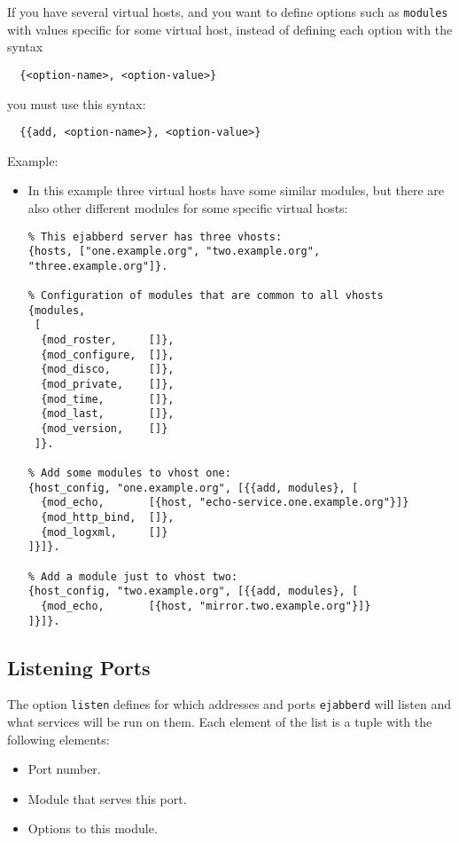 \documentclass[a4paper,10pt]{book}
\newcommand{\ind}[1]{\begin{latexonly}\index{#1}\end{latexonly}}
\newcommand{\option}[1]{\texttt{#1}}
\newcommand{\term}[1]{\texttt{#1}}
\newcommand{\ejabberd}{\texttt{ejabberd}}
\begin{document}
If you have several virtual hosts, 
and you want to define options such as \term{modules}
with values specific for some virtual host, 
instead of defining each option with the syntax
\begin{verbatim}
  {<option-name>, <option-value>}
\end{verbatim}
you must use this syntax:
\begin{verbatim}
  {{add, <option-name>}, <option-value>}
\end{verbatim}

Example:
\begin{itemize}
	\item In this example three virtual hosts have some similar modules, but there are also
	other different modules for some specific virtual hosts:
\begin{verbatim}
% This ejabberd server has three vhosts:
{hosts, ["one.example.org", "two.example.org", "three.example.org"]}.

% Configuration of modules that are common to all vhosts
{modules,
 [
  {mod_roster,     []},
  {mod_configure,  []},
  {mod_disco,      []},
  {mod_private,    []},
  {mod_time,       []},
  {mod_last,       []},
  {mod_version,    []}
 ]}.

% Add some modules to vhost one:
{host_config, "one.example.org", [{{add, modules}, [
  {mod_echo,       [{host, "echo-service.one.example.org"}]}
  {mod_http_bind,  []},
  {mod_logxml,     []}
]}]}.

% Add a module just to vhost two:
{host_config, "two.example.org", [{{add, modules}, [
  {mod_echo,       [{host, "mirror.two.example.org"}]}
]}]}.
\end{verbatim}
\end{itemize}

\subsection{Listening Ports}
\label{listened}
\ind{options!listen}

The option \option{listen} defines for which addresses and ports \ejabberd{}
will listen and what services will be run on them. Each element of the list is a
tuple with the following elements:
\begin{itemize}
\item Port number.
\item Module that serves this port.
\item Options to this module.
\end{itemize}
\end{document}
